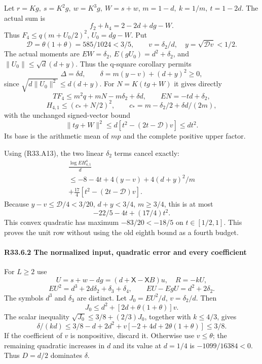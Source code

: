 Let \(r=Kg,\allowbreak \allowbreak  \ s=K^2g,\allowbreak \allowbreak  \ w=K^3g,\allowbreak \allowbreak  \ W=s+w\),
\(m=1-d,\allowbreak \allowbreak  \ k=1/m,\allowbreak \allowbreak  \ t=1-2d\).
The actual sum is
\[
f_2+h_4=2-2d+dg-W.
\]
Thus \(F_4\le q(m+U_0/2)^2\), \(U_0=dg-W\).
Put
\[
 \mathcal D=\theta(1+\theta)=585/1024<3/5,\qquad
 v=\delta_2/d,\quad y=\sqrt{\mathcal Dv}<1/2.
\]
The actual moments are $EW=\delta_2$,
$E(gU_0)=d^2+\delta_2$, and
$\|U_0\|\le\sqrt d(d+y)$.
Thus the q-square corollary permits
\[
 \Delta=\delta d,\qquad
 \delta=m(y-v)+(d+y)^2\ge0,
\]
since $\sqrt{d\|U_0\|^2}\le d(d+y)$.
For $N=K(tg+W)$ it gives directly
\[
 TF_4\le m^2q+mN-m\delta_2+\delta d,
 \qquad EN=-td+\delta_2,
\]
\[
 H_{4,1}\le(c_*+N/2)^2,\qquad
 c_*=m-\delta_2/2+\delta d/(2m),
\]
with the unchanged signed-vector bound
\[
 \|tg+W\|^2\le d[t^2-(2t-\mathcal D)v]\le dt^2.
\]
Its base is the arithmetic mean of $mp$ and the complete
positive upper factor.

Using (R33.A13), the two linear \(\delta_2\) terms cancel exactly:
\[
\begin{gathered}
\frac{\log EH_{4,1}^4}{d}\\
\le-8-4t+4(y-v)+4(d+y)^2/m\\
+\frac{17}{4}[t^2-(2t-\mathcal D)v].
\end{gathered}
\]
Because \(y-v\le\mathcal D/4<3/20\),
\(d+y<3/4\), \(m\ge3/4\), this is at most
\[
-22/5-4t+(17/4)t^2.
\]
This convex quadratic has maximum \(-83/20<-18/5\) on
\(t\in[1/2,\allowbreak \allowbreak  1]\). This proves the unit row without using the old
eighth bound as a fourth budget.

\paragraph{R33.6.2 The normalized input, quadratic error and every coefficient}

For \(L\ge 2\) use
\[
U=s+w-dg=(d+\mathsf X-\mathsf XB)u,\quad R=-kU,
\]
\[
EU^2=d^3+2d\delta_2+\delta_3+\delta_4,\qquad EU-EgU=d^2+2\delta_2.
\]
The symbols \(d^3\) and \(\delta_3\) are distinct.
Let \(J_0=EU^2/d\), \(v=\delta_2/d\). Then
\[
J_0\le d^2+[2d+\theta(1+\theta)]v.
\]
The scalar inequality
\(\sqrt{J_0}\le3/8+(2/3)J_0\), together with \(k\le4/3\), gives
\[
\delta/(kd)
\le3/8-d+2d^2+v[-2+4d+2\theta(1+\theta)]\le3/8.
\]
If the coefficient of \(v\) is nonpositive, discard it.
Otherwise use \(v\le\theta\); the remaining quadratic increases
in \(d\) and its value at \(d=1/4\) is
\(-1099/16384<0\). Thus \(D=d/2\) dominates \(\delta\).

